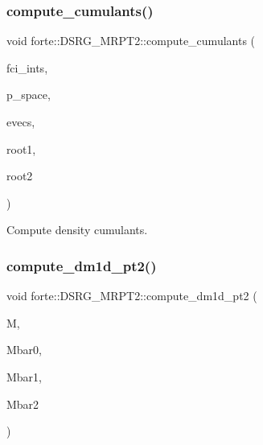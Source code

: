 \subsubsection{\texorpdfstring{compute\+\_\+cumulants()}{compute\_cumulants()}}
{\footnotesize\ttfamily void forte\+::\+D\+S\+R\+G\+\_\+\+M\+R\+P\+T2\+::compute\+\_\+cumulants (\begin{DoxyParamCaption}\item[{std\+::shared\+\_\+ptr$<$ \mbox{\hyperlink{classforte_1_1_active_space_integrals}{Active\+Space\+Integrals}} $>$}]{fci\+\_\+ints,  }\item[{std\+::vector$<$ \mbox{\hyperlink{namespaceforte_a2076c63fd7b8732004d9e1442ce527c1}{forte\+::\+Determinant}} $>$ \&}]{p\+\_\+space,  }\item[{psi\+::\+Shared\+Matrix}]{evecs,  }\item[{const int \&}]{root1,  }\item[{const int \&}]{root2 }\end{DoxyParamCaption})\hspace{0.3cm}{\ttfamily [protected]}}



Compute density cumulants. 

\mbox{\label{classforte_1_1_d_s_r_g___m_r_p_t2_a7f7af22aa379020de56d8234a3113f2a}} 
\subsubsection{\texorpdfstring{compute\+\_\+dm1d\+\_\+pt2()}{compute\_dm1d\_pt2()}\hspace{0.1cm}{\footnotesize\ttfamily [1/2]}}
{\footnotesize\ttfamily void forte\+::\+D\+S\+R\+G\+\_\+\+M\+R\+P\+T2\+::compute\+\_\+dm1d\+\_\+pt2 (\begin{DoxyParamCaption}\item[{Blocked\+Tensor \&}]{M,  }\item[{double \&}]{Mbar0,  }\item[{Blocked\+Tensor \&}]{Mbar1,  }\item[{Blocked\+Tensor \&}]{Mbar2 }\end{DoxyParamCaption})\hspace{0.3cm}{\ttfamily [protected]}}



